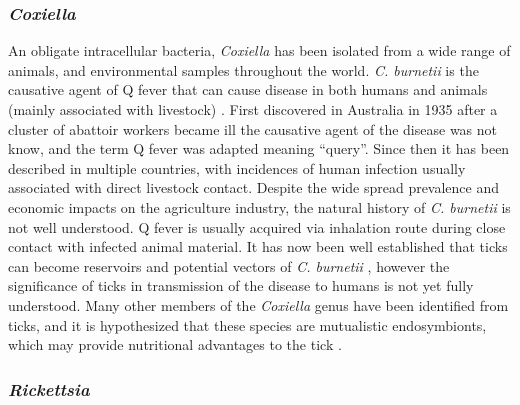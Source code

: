 \documentclass[a4paper, nobind]{templates/ociamthesis}
\begin{document}
\hypertarget{coxiella}{%
\subsubsection{\texorpdfstring{\emph{Coxiella}}{Coxiella}}\label{coxiella}}

An obligate intracellular bacteria, \emph{Coxiella} has been isolated from a wide range of animals, and environmental samples throughout the world.
\emph{C. burnetii} is the causative agent of Q fever that can cause disease in both humans and animals (mainly associated with livestock) \autocite{gonzalez-barrioCoxiellaBurnetiiWild2018}.
First discovered in Australia in 1935 after a cluster of abattoir workers became ill \autocite{derrickFEVERNEWFEVER1937} the causative agent of the disease was not know, and the term Q fever was adapted meaning ``query''.
Since then it has been described in multiple countries, with incidences of human infection usually associated with direct livestock contact.
Despite the wide spread prevalence and economic impacts on the agriculture industry, the natural history of \emph{C. burnetii} is not well understood.
Q fever is usually acquired via inhalation route during close contact with infected animal material.
It has now been well established that ticks can become reservoirs and potential vectors of \emph{C. burnetii} \autocite{arricau-bouveryFeverEmergingReemerging2005}, however the significance of ticks in transmission of the disease to humans is not yet fully understood.
Many other members of the \emph{Coxiella} genus have been identified from ticks, and it is hypothesized that these species are mutualistic endosymbionts, which may provide nutritional advantages to the tick \autocite{kobayashiMolecularDetectionGenotyping2021}.

\hypertarget{rickettsia}{%
\subsubsection{\texorpdfstring{\emph{Rickettsia}}{Rickettsia}}\label{rickettsia}}
\end{document}
